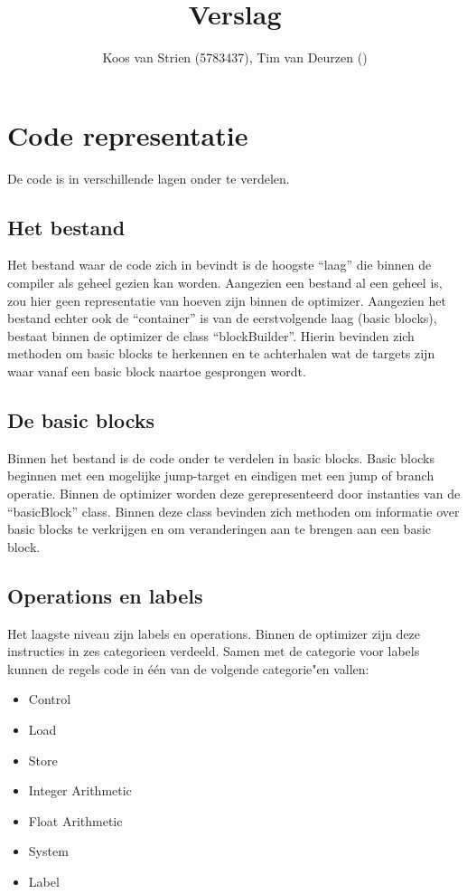 \documentclass[a4paper,10pt]{article}
\author{Koos van Strien (5783437), Tim van Deurzen ()}
\title{Verslag}
\begin{document}
\maketitle

\section{Code representatie}
De code is in verschillende lagen onder te verdelen.

\subsection{Het bestand}
Het bestand waar de code zich in bevindt is de hoogste ``laag'' die binnen de
compiler als geheel gezien kan worden.  Aangezien een bestand al een geheel is,
zou hier geen representatie van hoeven zijn binnen de optimizer. Aangezien het
bestand echter ook de ``container'' is van de eerstvolgende laag (basic blocks),
bestaat binnen de optimizer de class ``blockBuilder''. Hierin bevinden zich
methoden om basic blocks te herkennen en te achterhalen wat de targets zijn
waar vanaf een basic block naartoe gesprongen wordt.


\subsection{De basic blocks}
Binnen het bestand is de code onder te verdelen in basic blocks. Basic blocks
beginnen met een mogelijke jump-target en eindigen met een jump of branch
operatie. Binnen de optimizer worden deze gerepresenteerd door instanties 
van de ``basicBlock'' class. Binnen deze class bevinden zich methoden om
informatie over basic blocks te verkrijgen en om veranderingen aan te brengen
aan een basic block.

\subsection{Operations en labels}
Het laagste niveau zijn labels en operations. Binnen de optimizer zijn deze 
instructies in zes categorieen verdeeld. Samen met de categorie voor labels
kunnen de regels code in \'e\'en van de volgende categorie"en vallen:
\begin{itemize}
\item Control
\item Load
\item Store
\item Integer Arithmetic
\item Float Arithmetic
\item System
\item Label
\end{itemize}
\end{document}
